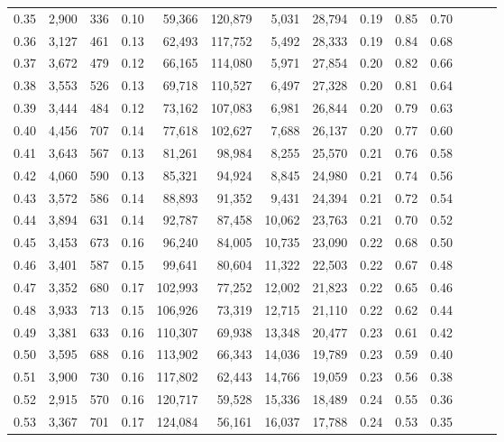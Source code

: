 \begin{tabular}{rrrrrrrrrrrrrr}
0.35 &  2,900 &  336 &  0.10 &   59,366 &  120,879 &   5,031 &  28,794 &  0.19 &  0.85 &      0.70 \\
0.36 &  3,127 &  461 &  0.13 &   62,493 &  117,752 &   5,492 &  28,333 &  0.19 &  0.84 &      0.68 \\
0.37 &  3,672 &  479 &  0.12 &   66,165 &  114,080 &   5,971 &  27,854 &  0.20 &  0.82 &      0.66 \\
0.38 &  3,553 &  526 &  0.13 &   69,718 &  110,527 &   6,497 &  27,328 &  0.20 &  0.81 &      0.64 \\
0.39 &  3,444 &  484 &  0.12 &   73,162 &  107,083 &   6,981 &  26,844 &  0.20 &  0.79 &      0.63 \\
0.40 &  4,456 &  707 &  0.14 &   77,618 &  102,627 &   7,688 &  26,137 &  0.20 &  0.77 &      0.60 \\
0.41 &  3,643 &  567 &  0.13 &   81,261 &   98,984 &   8,255 &  25,570 &  0.21 &  0.76 &      0.58 \\
0.42 &  4,060 &  590 &  0.13 &   85,321 &   94,924 &   8,845 &  24,980 &  0.21 &  0.74 &      0.56 \\
0.43 &  3,572 &  586 &  0.14 &   88,893 &   91,352 &   9,431 &  24,394 &  0.21 &  0.72 &      0.54 \\
0.44 &  3,894 &  631 &  0.14 &   92,787 &   87,458 &  10,062 &  23,763 &  0.21 &  0.70 &      0.52 \\
0.45 &  3,453 &  673 &  0.16 &   96,240 &   84,005 &  10,735 &  23,090 &  0.22 &  0.68 &      0.50 \\
0.46 &  3,401 &  587 &  0.15 &   99,641 &   80,604 &  11,322 &  22,503 &  0.22 &  0.67 &      0.48 \\
0.47 &  3,352 &  680 &  0.17 &  102,993 &   77,252 &  12,002 &  21,823 &  0.22 &  0.65 &      0.46 \\
0.48 &  3,933 &  713 &  0.15 &  106,926 &   73,319 &  12,715 &  21,110 &  0.22 &  0.62 &      0.44 \\
0.49 &  3,381 &  633 &  0.16 &  110,307 &   69,938 &  13,348 &  20,477 &  0.23 &  0.61 &      0.42 \\
0.50 &  3,595 &  688 &  0.16 &  113,902 &   66,343 &  14,036 &  19,789 &  0.23 &  0.59 &      0.40 \\
0.51 &  3,900 &  730 &  0.16 &  117,802 &   62,443 &  14,766 &  19,059 &  0.23 &  0.56 &      0.38 \\
0.52 &  2,915 &  570 &  0.16 &  120,717 &   59,528 &  15,336 &  18,489 &  0.24 &  0.55 &      0.36 \\
0.53 &  3,367 &  701 &  0.17 &  124,084 &   56,161 &  16,037 &  17,788 &  0.24 &  0.53 &      0.35 \\

\end{tabular}

